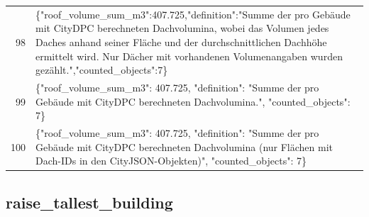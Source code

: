 \documentclass[a4paper,11pt]{article}
\begin{document}
\begin{table}[ht]
\begin{tabular}{r p{12cm}}
98 & \{"roof\_volume\_sum\_m3":407.725,"definition":"Summe der pro Gebäude mit CityDPC berechneten Dachvolumina, wobei das Volumen jedes Daches anhand seiner Fläche und der durchschnittlichen Dachhöhe ermittelt wird. Nur Dächer mit vorhandenen Volumenangaben wurden gezählt.","counted\_objects":7\} \\
99 & \{"roof\_volume\_sum\_m3": 407.725, "definition": "Summe der pro Gebäude mit CityDPC berechneten Dachvolumina.", "counted\_objects": 7\} \\
100 & \{"roof\_volume\_sum\_m3": 407.725, "definition": "Summe der pro Gebäude mit CityDPC berechneten Dachvolumina (nur Flächen mit Dach-IDs in den CityJSON-Objekten)", "counted\_objects": 7\} \\
\hline
\end{tabular}
\end{table}

\clearpage
\subsection{raise\_tallest\_building}
\end{document}
